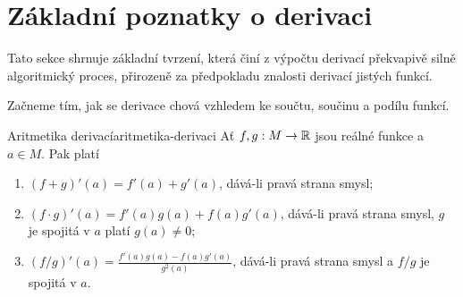\section{Základní poznatky o derivaci}
\label{sec:zakladni-poznatky-o-derivaci}

Tato sekce shrnuje základní tvrzení, která činí z výpočtu derivací překvapivě
silně algoritmický proces, přirozeně za předpokladu znalosti derivací jistých
 funkcí.

Začneme tím, jak se derivace chová vzhledem ke součtu, součinu a podílu funkcí.

\begin{theorem}{Aritmetika derivací}{aritmetika-derivaci}
 Ať $f,g:M \to \mathbb{R}$ jsou reálné funkce a $a \in M$. Pak platí
 \begin{enumerate}
  \item $(f + g)'(a) = f'(a) + g'(a)$, dává-li pravá strana smysl;
  \item $(f \cdot g)'(a) = f'(a)g(a) + f(a)g'(a)$, dává-li pravá strana smysl,
   $g$ je spojitá v $a$ platí $g(a) \neq 0$;
  \item $(f / g)'(a) = \frac{f'(a)g(a) - f(a)g'(a)}{g^2(a)}$, dává-li pravá
   strana smysl a $f / g$ je spojitá v $a$.
 \end{enumerate}
\end{theorem}
